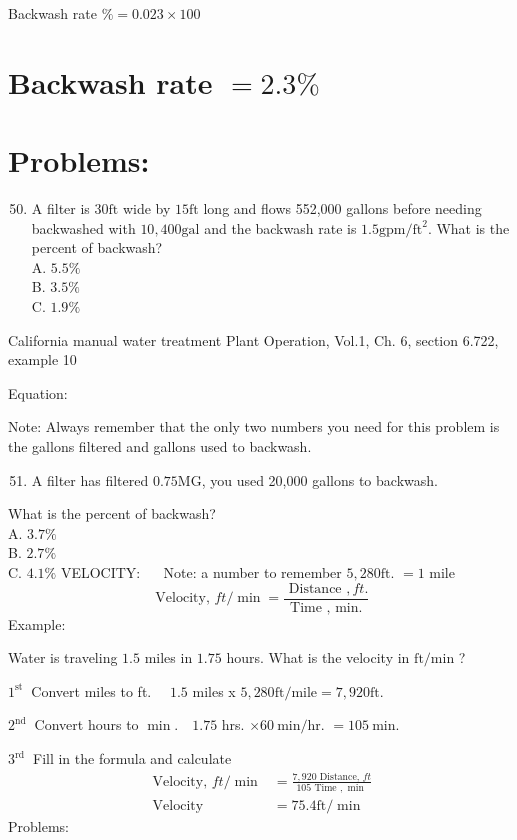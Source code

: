 \begin{enumerate}
Backwash rate $\%=0.023 \times 100$

\section{Backwash rate $=2.3 \%$}
\section{Problems:}
\begin{enumerate}
  \setcounter{enumi}{49}
  \item A filter is $30 \mathrm{ft}$ wide by $15 \mathrm{ft}$ long and flows 552,000 gallons before needing backwashed with $10,400 \mathrm{gal}$ and the backwash rate is $1.5 \mathrm{gpm} / \mathrm{ft}^{2}$. What is the percent of backwash?\\
A. $5.5 \%$\\
B. $3.5 \%$\\
C. $1.9 \%$
\end{enumerate}
California manual water treatment Plant Operation, Vol.1, Ch. 6, section 6.722, example 10

Equation:

Note: Always remember that the only two numbers you need for this problem is the gallons filtered and gallons used to backwash.

\begin{enumerate}
  \setcounter{enumi}{50}
  \item A filter has filtered $0.75 \mathrm{MG}$, you used 20,000 gallons to backwash.
\end{enumerate}
What is the percent of backwash?\\
A. $3.7 \%$\\
B. $2.7 \%$\\
C. $4.1 \%$ VELOCITY: $\quad$ Note: a number to remember $5,280 \mathrm{ft}$. $=1$ mile
$$
\text { Velocity, } f t / \min =\frac{\text { Distance }, f t .}{\text { Time }, \text { min. }}
$$
Example:

Water is traveling $1.5$ miles in $1.75$ hours. What is the velocity in $\mathrm{ft} / \mathrm{min}$ ?

$1^{\text {st }}$ Convert miles to ft. $\quad 1.5$ miles x $5,280 \mathrm{ft} / \mathrm{mile}=7,920 \mathrm{ft}$.

$2^{\text {nd }}$ Convert hours to $\min . \quad 1.75$ hrs. $\times 60 \mathrm{~min} / \mathrm{hr}$. $=105 \mathrm{~min} .$

$3^{\text {rd }}$ Fill in the formula and calculate
$$
\begin{aligned}
\text { Velocity, } f t / \min &=\frac{7,920 \text { Distance, } f t}{105 \text { Time }, \text { min }} \\
\text { Velocity } &=75.4 \mathrm{ft} / \min
\end{aligned}
$$
Problems:


\end{enumerate}
